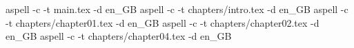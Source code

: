 aspell -c -t main.tex -d en_GB
aspell -c -t chapters/intro.tex -d en_GB
aspell -c -t chapters/chapter01.tex -d en_GB
aspell -c -t chapters/chapter02.tex -d en_GB
aspell -c -t chapters/chapter04.tex -d en_GB
